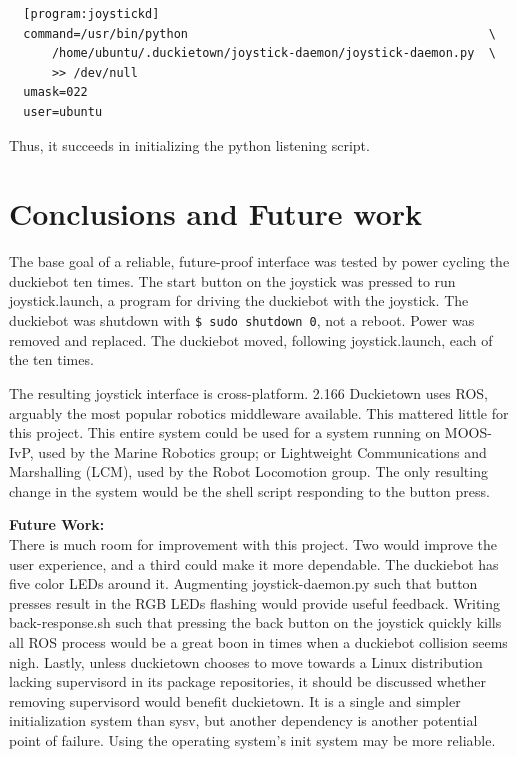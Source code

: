 \documentclass[titlepage]{article}
\begin{document}
\begin{lstlisting}
  [program:joystickd]
  command=/usr/bin/python                                          \
      /home/ubuntu/.duckietown/joystick-daemon/joystick-daemon.py  \
      >> /dev/null
  umask=022
  user=ubuntu
\end{lstlisting}

Thus, it succeeds in initializing the python listening script. 


\section{Conclusions and Future work}
The base goal of a reliable, future-proof interface was tested by power cycling the duckiebot ten times. The start button on the joystick was pressed to run joystick.launch, a program for driving the duckiebot with the joystick. The duckiebot was shutdown with \texttt{\$ sudo shutdown 0}, not a reboot. Power was removed and replaced. The duckiebot moved, following joystick.launch, each of the ten times. 

The resulting joystick interface is cross-platform. 2.166 Duckietown uses ROS, arguably the most popular robotics middleware available. This mattered little for this project. This entire system could be used for a system running on MOOS-IvP, used by the Marine Robotics group; or Lightweight Communications and Marshalling (LCM), used by the Robot Locomotion group. The only resulting change in the system would be the shell script responding to the button press. 

\textbf{Future Work:} \\
There is much room for improvement with this project. Two would improve the user experience, and a third could make it more dependable. 
The duckiebot has five color LEDs around it. Augmenting joystick-daemon.py such that button presses result in the RGB LEDs flashing would provide useful feedback. 
Writing back-response.sh such that pressing the back button on the joystick quickly kills all ROS process would be a great boon in times when a duckiebot collision seems nigh. 
Lastly, unless duckietown chooses to move towards a Linux distribution lacking supervisord in its package repositories, it should be discussed whether removing supervisord would benefit duckietown. It is a single and simpler initialization system than sysv, but another dependency is another potential point of failure. Using the operating system's init system may be more reliable. 
\end{document}
